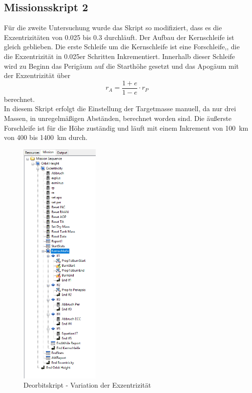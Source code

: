 
\subsection{Missionsskript 2}

	Für die zweite Untersuchung wurde das Skript so modifiziert, dass es die Exzentrizitäten von \num{0.025} bis \num{0.3} durchläuft.
Der Aufbau der Kernschleife ist gleich geblieben. Die erste Schleife um die Kernschleife ist eine Forschleife,, die die Exzentrizität in \num{0.025}er Schritten Inkrementiert. Innerhalb dieser Schleife wird zu Beginn das Perigäum auf die Starthöhe gesetzt und das Apogäum mit der Exzentrizität über
\begin{equation}
r_A = \frac{1+e}{1-e}\cdot r_P
\label{apoapsis}
\end{equation}
berechnet.\\

	In diesem Skript erfolgt die Einstellung der Targetmasse manuell, da nur drei Massen, in unregelmäßigen Abständen, berechnet worden sind. Die äußerste Forschleife ist für die Höhe zuständig und läuft mit einem Inkrement von \SI{100}{\kilo\metre} von \num{400} bis \SI{1400}{\kilo\metre} durch. 
\begin{figure}[!h]
	\centering
		\includegraphics[width=0.35\textwidth]{graphics/GMAT/GMAT_Skript_ECC.PNG}
		\caption{Deorbitskript - Variation der Exzentrizität}
			\label{fig:GMAT_Skript_ECC}
\end{figure}



